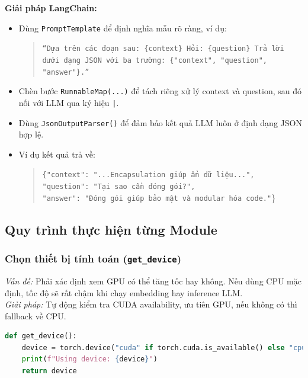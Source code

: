 \documentclass[11pt]{article}
\begin{document}
\noindent \textbf{Giải pháp LangChain:}\\
\begin{itemize}
    \item Dùng \texttt{PromptTemplate} để định nghĩa mẫu rõ ràng, ví dụ:
    \begin{quote}
    \texttt{“Dựa trên các đoạn sau: \{context\}\\
    Hỏi: \{question\}\\
    Trả lời dưới dạng JSON với ba trường: \{"context", "question", "answer"\}.”}
    \end{quote}
    \item Chèn bước \texttt{RunnableMap(...)} để tách riêng xử lý context và question, sau đó nối với LLM qua ký hiệu \texttt{|}.
    \item Dùng \texttt{JsonOutputParser()} để đảm bảo kết quả LLM luôn ở định dạng JSON hợp lệ.
    \item Ví dụ kết quả trả về:
    \begin{quote}
        \texttt{\{"context": "...Encapsulation giúp ẩn dữ liệu...",}\\
        \texttt{"question": "Tại sao cần đóng gói?",}\\
        \texttt{"answer": "Đóng gói giúp bảo mật và modular hóa code."}\}
    \end{quote}
\end{itemize}


\subsection{Quy trình thực hiện từng Module}
\label{sec:code_modules}

\subsubsection{Chọn thiết bị tính toán (\texttt{get\_device})}

\textit{Vấn đề:} Phải xác định xem GPU có thể tăng tốc hay không. Nếu dùng CPU mặc định, tốc độ sẽ rất chậm khi chạy embedding hay inference LLM.\\

\noindent\textit{Giải pháp:} Tự động kiểm tra CUDA availability, ưu tiên GPU, nếu không có thì fallback về CPU.\\

\begin{lstlisting}[language=Python, caption=Chọn thiết bị tính toán]
def get_device():
    device = torch.device("cuda" if torch.cuda.is_available() else "cpu")
    print(f"Using device: {device}")
    return device
\end{lstlisting}
\end{document}

